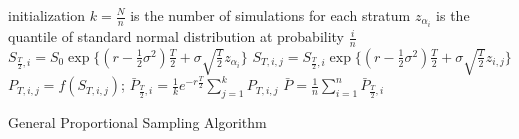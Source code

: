 \begin{algorithm}[H]
 initialization\;
 $k = \frac{N}{n}$ is the number of simulations for each stratum\;
  {
 $z_{\alpha_{i}}$ is the quantile of standard normal distribution at probability $\frac{i}{n}$\;
 $S_{\frac{T}{2}, i} = S_{0}\exp\{(r-\frac{1}{2}\sigma^{2})\frac{T}{2} + \sigma \sqrt{\frac{T}{2}}z_{\alpha_{i}}\}$\;
  {
 $S_{T, i, j} = S_{\frac{T}{2}, i}\exp\{(r-\frac{1}{2}\sigma^{2})\frac{T}{2} + \sigma \sqrt{\frac{T}{2}}z_{i,j}\}$\;
 $P_{T, i, j} = f(S_{T, i, j})$;
 }
 $\bar{P}_{\frac{T}{2}, i} = \frac{1}{k} e^{-r\frac{T}{2}}  \sum_{j=1}^{k} P_{T, i, j}$\;
 }
 $\bar{P} = \frac{1}{n} \sum_{i=1}^{n} \bar{P}_{\frac{T}{2}, i}$\;
\caption{General Proportional Sampling Algorithm}
\end{algorithm}
\newpage

